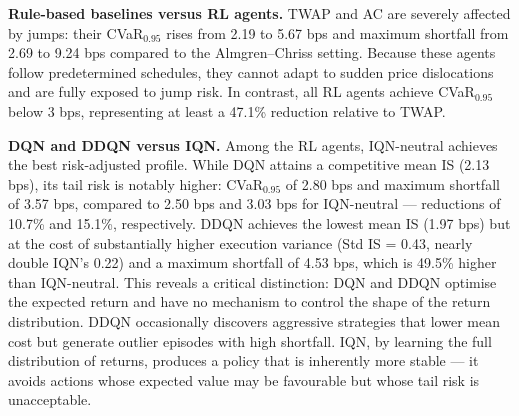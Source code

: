 \documentclass[11pt]{article}
\begin{document}
\textbf{Rule-based baselines versus RL agents.}  TWAP and AC are severely affected by jumps: their CVaR$_{0.95}$ rises from 2.19 to 5.67 bps and maximum shortfall from 2.69 to 9.24 bps compared to the Almgren--Chriss setting.  Because these agents follow predetermined schedules, they cannot adapt to sudden price dislocations and are fully exposed to jump risk.  In contrast, all RL agents achieve CVaR$_{0.95}$ below 3 bps, representing at least a 47.1\% reduction relative to TWAP.
 
\textbf{DQN and DDQN versus IQN.}  Among the RL agents, IQN-neutral achieves the best risk-adjusted profile.  While DQN attains a competitive mean IS (2.13 bps), its tail risk is notably higher: CVaR$_{0.95}$ of 2.80 bps and maximum shortfall of 3.57 bps, compared to 2.50 bps and 3.03 bps for IQN-neutral --- reductions of 10.7\% and 15.1\%, respectively.  DDQN achieves the lowest mean IS (1.97 bps) but at the cost of substantially higher execution variance (Std IS = 0.43, nearly double IQN's 0.22) and a maximum shortfall of 4.53 bps, which is 49.5\% higher than IQN-neutral.  This reveals a critical distinction: DQN and DDQN optimise the expected return and have no mechanism to control the shape of the return distribution.  DDQN occasionally discovers aggressive strategies that lower mean cost but generate outlier episodes with high shortfall.  IQN, by learning the full distribution of returns, produces a policy that is inherently more stable --- it avoids actions whose expected value may be favourable but whose tail risk is unacceptable.
 
 
 
\end{document}
